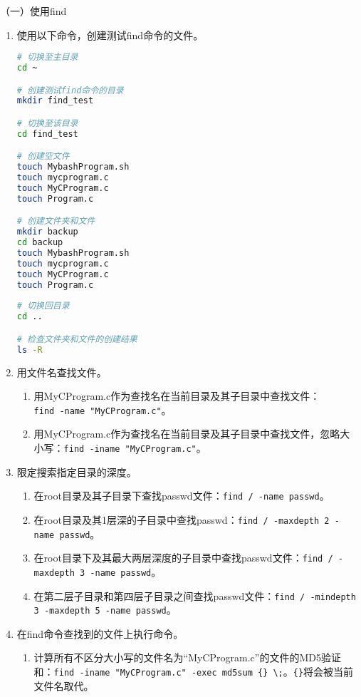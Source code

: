 \vspace{0.1in}
（一）使用find
\begin{enumerate}
  \item 使用以下命令，创建测试find命令的文件。
\begin{lstlisting}[language=bash]
# 切换至主目录
cd ~

# 创建测试find命令的目录
mkdir find_test

# 切换至该目录
cd find_test

# 创建空文件
touch MybashProgram.sh
touch mycprogram.c
touch MyCProgram.c
touch Program.c

# 创建文件夹和文件 
mkdir backup
cd backup
touch MybashProgram.sh
touch mycprogram.c
touch MyCProgram.c
touch Program.c
 
# 切换回目录
cd ..

# 检查文件夹和文件的创建结果
ls -R
\end{lstlisting}
  \item 用文件名查找文件。
    \begin{enumerate}
      \item 用MyCProgram.c作为查找名在当前目录及其子目录中查找文件：\\ \verb|find -name "MyCProgram.c"|。
      \item 用MyCProgram.c作为查找名在当前目录及其子目录中查找文件，忽略大小写：\verb|find -iname "MyCProgram.c"|。
    \end{enumerate}
  \item 限定搜索指定目录的深度。
    \begin{enumerate}
      \item 在root目录及其子目录下查找passwd文件：\verb|find / -name passwd|。
      \item 在root目录及其1层深的子目录中查找passwd：\verb|find / -maxdepth 2 -name passwd|。
      \item 在root目录下及其最大两层深度的子目录中查找passwd文件：\verb|find / -maxdepth 3 -name passwd|。
      \item 在第二层子目录和第四层子目录之间查找passwd文件：\verb|find / -mindepth 3 -maxdepth 5 -name passwd|。
    \end{enumerate}
  \item 在find命令查找到的文件上执行命令。
    \begin{enumerate}
      \item 计算所有不区分大小写的文件名为“MyCProgram.c”的文件的MD5验证和：\verb|find -iname "MyCProgram.c" -exec md5sum {} \;|。\verb|{}|将会被当前文件名取代。
    \end{enumerate}

\end{enumerate}

